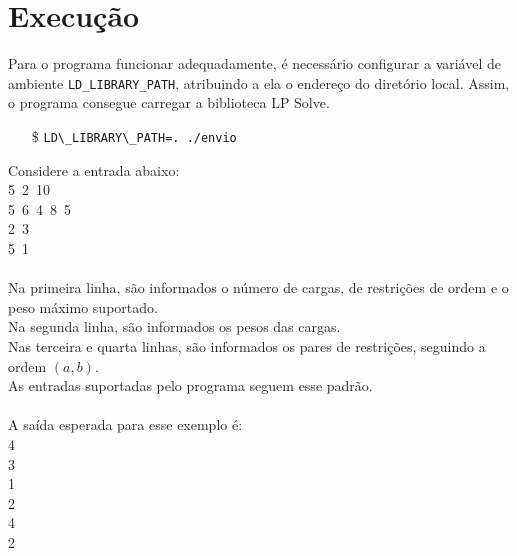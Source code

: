 \documentclass{article}
\begin{document}
\newpage
\section{Execução}

Para o programa funcionar adequadamente, é necessário configurar a variável de ambiente \texttt{LD\_LIBRARY\_PATH}, atribuindo a ela o endereço do diretório local. Assim, o programa consegue carregar a biblioteca LP Solve.
\begin{enumerate}
    \item[\$] \verb|LD\_LIBRARY\_PATH=. ./envio|
\end{enumerate}

Considere a entrada abaixo:\\
    5\mbox{ }2\mbox{ }10\\
    5\mbox{ }6\mbox{ }4\mbox{ }8\mbox{ }5\\
    2\mbox{ }3\\
    5\mbox{ }1\\
\\    
Na primeira linha, são informados o número de cargas, de restrições de ordem e o peso máximo suportado.\\
Na segunda linha, são informados os pesos das cargas.\\
Nas terceira e quarta linhas, são informados os pares de restrições, seguindo a ordem $(a, b)$.\\
As entradas suportadas pelo programa seguem esse padrão.\\
\\
A saída esperada para esse exemplo é:\\
4\\
3\\
1\\
2\\
4\\
2\\
\end{document}
